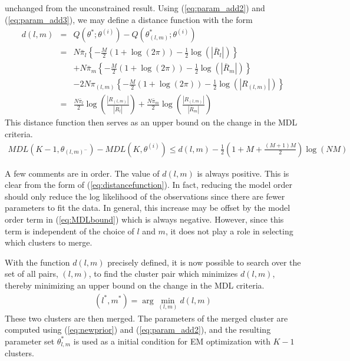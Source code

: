 \documentclass[12pt]{article}
\begin{document}
unchanged from the unconstrained result.
Using (\ref{eq:param_add2}) and (\ref{eq:param_add3}), 
we may define a distance function with the form
\begin{eqnarray}
\nonumber
d(l,m) 
&=& Q(\theta^*;\theta^{(i)}) - Q(\theta^*_{(l,m)};\theta^{(i)})\\
\nonumber
&=& N \bar{\pi}_l \left\{ - \frac{M}{2} (1+\log(2\pi)) 
    -  \frac{1}{2} \log(|\bar{R}_l|) \right\}\\
\nonumber
& & + N \bar{\pi}_m \left\{ - \frac{M}{2} (1+\log(2\pi)) 
    -  \frac{1}{2} \log(|\bar{R}_m|) \right\}\\
\nonumber
& & - 2N \pi_{(l,m)} \left\{ - \frac{M}{2} (1+\log(2\pi)) 
    -  \frac{1}{2} \log(|R_{(l,m)}|) \right\} \\
\label{eq:distancefunction}
&=& \frac{N \bar{\pi}_l}{2} \log\left( \frac{|R_{(l,m)}|}{|\bar{R}_l|} \right)
 +  \frac{N \bar{\pi}_m}{2} \log\left( \frac{|R_{(l,m)}|}{|\bar{R}_m|} \right)
\end{eqnarray}
This distance function then serves as an upper bound on the
change in the MDL criteria.
\begin{eqnarray}
MDL(K-1,\theta_{(l,m)^-}) - MDL(K,\theta^{(i)})
\leq d(l,m) - \frac{1}{2} \left(1 + M + \frac{(M+1)M}{2}\right) \log (NM)  
\label{eq:MDLbound}
\end{eqnarray}

A few comments are in order.
The value of $d(l,m)$ is always positive.
This is clear from the form of (\ref{eq:distancefunction}).
In fact, reducing the model order should only reduce
the log likelihood of the observations since there are fewer
parameters to fit the data.
In general, this increase may be offset by the model order
term in (\ref{eq:MDLbound}) which is always negative.
However, since this term is independent of the choice of $l$
and $m$, it does not play a role
in selecting which clusters to merge.

With the function $d(l,m)$ precisely defined, it is now possible
to search over the set of all pairs, $(l,m)$, to find the
cluster pair which minimizes $d(l,m)$,
thereby minimizing an upper bound on the change in the MDL criteria.
\begin{eqnarray}
\label{eq:reduce_update}
(l^*,m^*) = \arg \min_{(l,m)} d(l,m) 
\end{eqnarray}
These two clusters are then merged.
The parameters of the merged cluster are computed using
(\ref{eq:newprior}) and (\ref{eq:param_add2}),
and the resulting parameter set $\theta_{l,m}^*$ 
is used as a initial condition for EM optimization
with $K-1$ clusters.
\end{document}
